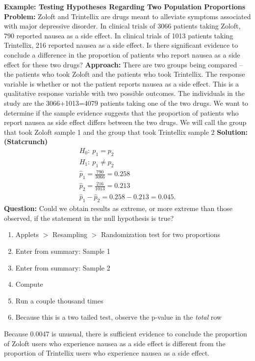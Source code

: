 \documentclass{report}
\begin{document}
    \pagebreak \bigbreak \noindent 
    \begin{mdframed}
      \textbf{Example: Testing Hypotheses Regarding Two Population Proportions}
      \bigbreak \noindent 
      \textbf{Problem:}
      Zoloft and Trintellix are drugs meant to alleviate symptoms associated with major depressive disorder. In clinical trials of 3066 patients taking Zoloft, 790 reported nausea as a side effect. In clinical trials of 1013 patients taking Trintellix, 216 reported nausea as a side effect. Is there significant evidence to conclude a difference in the proportion of patients who report nausea as a side effect for these two drugs? 
      \bigbreak \noindent 
      \textbf{Approach:}
      There are two groups being compared – the patients who took Zoloft and the patients who took Trintellix. The response variable is whether or not the patient reports nausea as a side effect. This is a qualitative response variable with two possible outcomes. The individuals in the study are the 3066+1013=4079 patients taking one of the two drugs.
      \bigbreak \noindent 
      We want to determine if the sample evidence suggests that the proportion of patients who report nausea as side effect differs between the two drugs. We will call the group that took Zoloft sample 1 and the group that took Trintellix sample 2
      \bigbreak \noindent 
      \textbf{Solution: (Statcrunch)}
      \begin{align*}
          H_{0}:\ p_{1} = p_{2} \\
          H_{1}:\ p_{1} \ne p_{2} \\
          \hat{p}_{1} = \frac{790}{3066} = 0.258 \\
          \hat{p}_{2} = \frac{216}{1013} = 0.213 \\
          \hat{p}_{1} - \hat{p}_{2} = 0.258 -0.213 = 0.045
      .\end{align*}
      \bigbreak \noindent 
      \textbf{Question:} Could we obtain results as extreme, or more extreme than those observed, if the statement in the null hypothesis is true?
      \begin{enumerate}
          \item Applets $>$ Resampling $>$ Randomization test for two proportions
            \item Enter from summary: Sample 1
            \item Enter from summary: Sample 2
            \item Compute
            \item Run a couple thousand times
            \item Because this is a two tailed test, observe the p-value in the \textit{total} row
      \end{enumerate}
      Because 0.0047 is unusual, there is sufficient evidence to conclude the proportion of Zoloft users who experience nausea as a side effect is different from the proportion of Trintellix users who experience nausea as a side effect.




      
    \end{mdframed}
\end{document}
